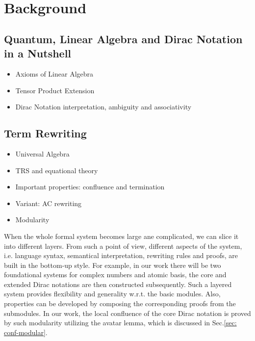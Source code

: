 
\section{Background}

\subsection{Quantum, Linear Algebra and Dirac Notation in a Nutshell}
\begin{itemize}
  \item Axioms of Linear Algebra

  \item Tensor Product Extension

  \item Dirac Notation interpretation, ambiguity and associativity
\end{itemize}

\subsection{Term Rewriting}

\begin{itemize}
  \item Universal Algebra

  \item TRS and equational theory
  
  \item Important properties: confluence and termination
  
  \item Variant: AC rewriting
  
  \item Modularity
\end{itemize}

When the whole formal system becomes large ane complicated, we can slice it into different layers. From such a point of view, different aspects of the system, i.e. language syntax, semantical interpretation, rewriting rules and proofs, are built in the bottom-up style. For example, in our work there will be two foundational systems for complex numbers and atomic basis, the core and extended Dirac notations are then constructed subsequently. Such a layered system provides flexibility and generality w.r.t. the basic modules. Also, properties can be developed by composing the corresponding proofs from the submodules. In our work, the local confluence of the core Dirac notation is proved by such modularity utilizing the avatar lemma, which is discussed in Sec.\ref{sec: conf-modular}.